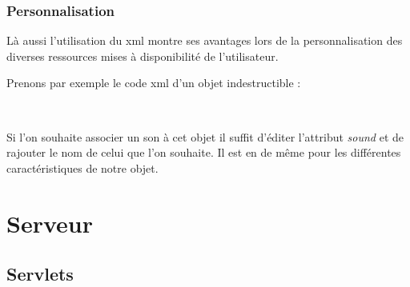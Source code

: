 		\subsubsection{Personnalisation}
	
			Là aussi l'utilisation du \gls{xml} montre ses avantages lors de la personnalisation
			des diverses ressources mises à disponibilité de l'utilisateur.
			
			Prenons par exemple le code \gls{xml} d'un objet indestructible :
			
			$\,$
		
			\begin{footnotesize}
				
			\end{footnotesize}
			
			Si l'on souhaite associer un son à cet objet il suffit d'éditer l'attribut \emph{sound}
			et de rajouter le nom de celui que l'on souhaite.
			Il est en de même pour les différentes caractéristiques de notre objet.		

\section{Serveur}

	\subsection{Servlets}